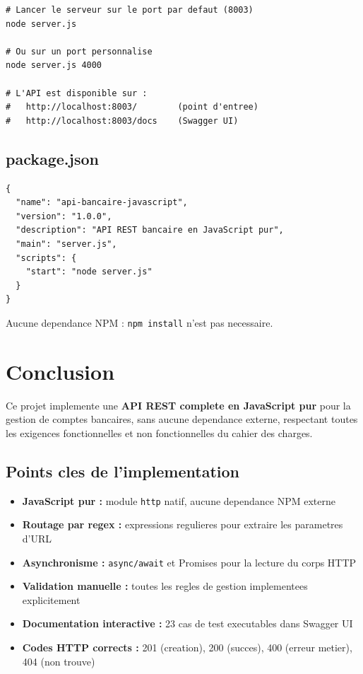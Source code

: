 \documentclass[12pt,a4paper]{article}
\begin{document}
\begin{lstlisting}[style=bash, caption={Lancement du serveur}]
# Lancer le serveur sur le port par defaut (8003)
node server.js

# Ou sur un port personnalise
node server.js 4000

# L'API est disponible sur :
#   http://localhost:8003/        (point d'entree)
#   http://localhost:8003/docs    (Swagger UI)
\end{lstlisting}

\subsection{package.json}

\begin{lstlisting}[style=json, caption={package.json}]
{
  "name": "api-bancaire-javascript",
  "version": "1.0.0",
  "description": "API REST bancaire en JavaScript pur",
  "main": "server.js",
  "scripts": {
    "start": "node server.js"
  }
}
\end{lstlisting}

Aucune dependance NPM : \texttt{npm install} n'est pas necessaire.

\section{Conclusion}

Ce projet implemente une \textbf{API REST complete en JavaScript pur} pour la gestion de comptes bancaires, sans aucune dependance externe, respectant toutes les exigences fonctionnelles et non fonctionnelles du cahier des charges.

\subsection*{Points cles de l'implementation}

\begin{itemize}[noitemsep]
  \item \textbf{JavaScript pur :} module \texttt{http} natif, aucune dependance NPM externe
  \item \textbf{Routage par regex :} expressions regulieres pour extraire les parametres d'URL
  \item \textbf{Asynchronisme :} \texttt{async/await} et Promises pour la lecture du corps HTTP
  \item \textbf{Validation manuelle :} toutes les regles de gestion implementees explicitement
  \item \textbf{Documentation interactive :} 23 cas de test executables dans Swagger UI
  \item \textbf{Codes HTTP corrects :} 201 (creation), 200 (succes), 400 (erreur metier), 404 (non trouve)
\end{itemize}
\end{document}
